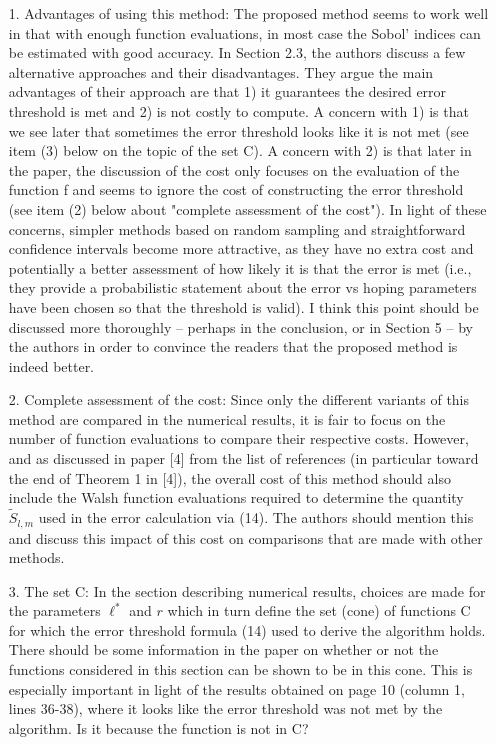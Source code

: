 \documentclass[10pt,a4paper]{article}
\begin{document}
\begin{itemize}
\item[1.] Advantages of using this method: The proposed method seems to work well in that with enough function evaluations, in most case the Sobol' indices can be estimated with good accuracy. In Section 2.3, the authors discuss a few alternative approaches and their disadvantages. They argue the main advantages of their approach are that 1) it guarantees the desired error threshold is met and 2) is not costly to compute. A concern with 1) is that we see later that sometimes the error threshold looks like it is not met (see item (3) below on the topic of the set C). A concern with 2) is that later in the paper, the discussion of the cost only focuses on the evaluation of the function f and seems to ignore the cost of constructing the error threshold (see item (2) below about "complete assessment of the cost"). In light of these concerns, simpler methods based on random sampling and straightforward confidence intervals become more attractive, as they have no extra cost and potentially a better assessment of how likely it is that the error is met (i.e., they provide a probabilistic statement about the error vs hoping parameters have been chosen so that the threshold is valid). I think this point should be discussed more thoroughly -- perhaps in the conclusion, or in Section 5 -- by the authors in order to convince the readers that the proposed method is indeed better.

\item[2.] Complete assessment of the cost: Since only the different variants of this method are compared in the numerical results, it is fair to focus on the number of function evaluations to compare their respective costs. However, and as discussed in paper [4] from the list of references (in particular toward the end of Theorem 1 in [4]), the overall cost of this method should also include the Walsh function evaluations required to determine the quantity $\widetilde{S}_{l,m}$ used in the error calculation via (14). The authors should mention this and discuss this impact of this cost on comparisons that are made with other methods.

\item[3.]The set C: In the section describing numerical results, choices are made for the parameters $\ell^*$ and $r$ which in turn define the set (cone) of functions C for which the error threshold formula (14) used to derive the algorithm holds. There should be some information in the paper on whether or not the functions considered in this section can be shown to be in this cone. This is especially important in light of the results obtained on page 10 (column 1, lines 36-38), where it looks like the error threshold was not met by the algorithm. Is it because the function is not in C?
\end{itemize}
\end{document}
